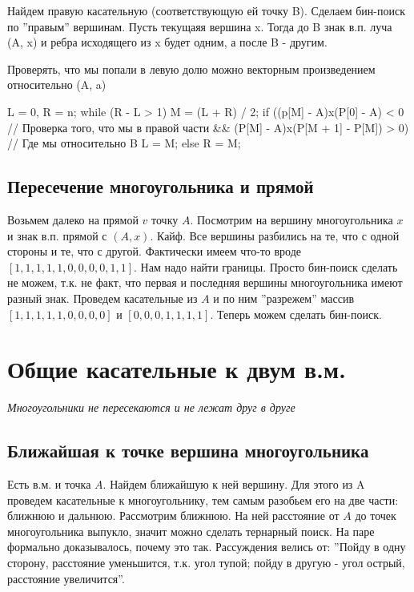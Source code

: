 Найдем правую касательную (соответствующую ей точку B). Сделаем бин-поиск по ''правым'' вершинам. Пусть текущаяя вершина x. Тогда до B знак в.п. луча (A, x) 
и ребра исходящего из x будет одним, а после B - другим.

Проверять, что мы попали в левую долю можно векторным произведением относительно (A, a)

\begin{cppcode}
    L = 0, R = n;
    while (R - L > 1) {
        M = (L + R) / 2;
        if ((p[M] - A)x(P[0] - A) < 0       // Проверка того, что мы в правой части
            && (P[M] - A)x(P[M + 1] - P[M]) > 0)    // Где мы относительно B
            L = M;
        } else {
            R = M;
        }
\end{cppcode}


\subsection{Пересечение многоугольника и прямой}
Возьмем далеко на прямой $v$ точку $A$. Посмотрим на вершину многоугольника $x$ и знак в.п. прямой с $(A, x)$. Кайф. Все вершины разбились на те, что с одной стороны и те, что с другой.
Фактически имеем что-то вроде $[1, 1, 1, 1, 1, 0, 0, 0, 0, 1, 1]$. Нам надо найти границы. Просто бин-поиск сделать не можем, т.к. не факт, что первая и последняя вершины 
многоугольника имеют разный знак. Проведем касательные из $A$ и по ним ''разрежем'' массив $[1, 1, 1, 1, 1, 0, 0, 0, 0]$ и $[0, 0, 0, 1, 1, 1, 1]$. Теперь можем сделать бин-поиск.


\section{Общие касательные к двум в.м.}

\textit{Многоугольники не пересекаются и не лежат друг в друге}

\subsection{Ближайшая к точке вершина многоугольника}
Есть в.м. и точка $A$. Найдем ближайшую к ней вершину. Для этого из A проведем касательные к многоугольнику, тем самым разобьем его на две части: ближнюю и дальнюю. 
Рассмотрим ближнюю. На ней расстояние от $A$ до точек многоугольника выпукло, значит можно сделать тернарный поиск. На паре формально доказывалось, почему это так. Рассуждения велись от: 
''Пойду в одну сторону, расстояние уменьшится, т.к. угол тупой; пойду в другую - угол острый, расстояние увеличится''.  

